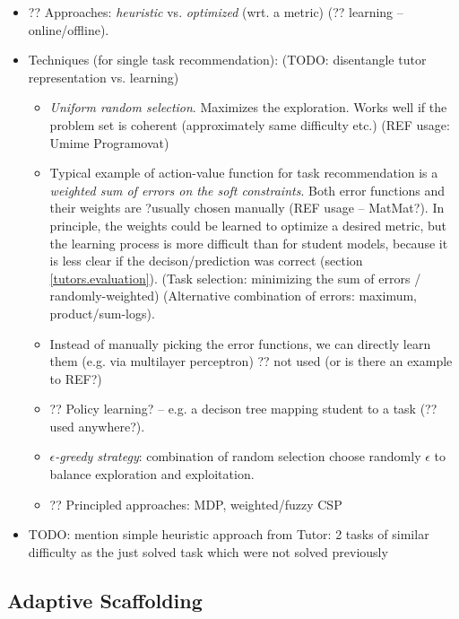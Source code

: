 \begin{itemize}
\item ?? Approaches: \emph{heuristic} vs. \emph{optimized} (wrt. a metric)
  (?? learning -- online/offline).
\item Techniques (for single task recommendation):
  (TODO: disentangle tutor representation vs. learning)
\begin{itemize}
\item \emph{Uniform random selection}. Maximizes the exploration.
  Works well if the problem set is coherent (approximately same difficulty etc.)
  (REF usage: Umime Programovat)
\item Typical example of action-value function for task recommendation is
  a \emph{weighted sum of errors on the soft constraints}.
  Both error functions and their weights are ?usually chosen manually
  (REF usage -- MatMat?).
  In principle, the weights could be learned to optimize a desired metric, but the
  learning process is more difficult than for student models,
  because it is less clear if the decison/prediction was correct
  (section \ref{tutors.evaluation}).
  (Task selection: minimizing the sum of errors / randomly-weighted)
  (Alternative combination of errors: maximum, product/sum-logs).
\item Instead of manually picking the error functions, we can directly learn
  them (e.g. via multilayer perceptron) %
  ?? not used (or is there an example to REF?)
\item ?? Policy learning? -- e.g. a decison tree mapping student to a task
  (?? used anywhere?).
\item \emph{$\epsilon$-greedy strategy}: combination of random selection choose randomly $\epsilon$
  to balance exploration and exploitation.
\item ?? Principled approaches: MDP, weighted/fuzzy CSP
\end{itemize}
\item TODO: mention simple heuristic approach from Tutor: 2 tasks of similar difficulty as the just solved task which were not solved previously
\end{itemize}


\subsection{Adaptive Scaffolding}

